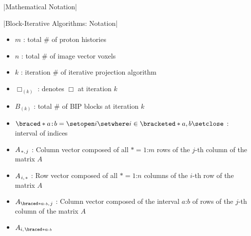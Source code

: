 \begin{tcbenvironment}|Mathematical Notation|
\begin{tcbparbox}|Block-Iterative Algorithms: Notation|%
    \begin{itemize}
        \item $m$ : total \# of proton histories
        \item $n$ : total \# of image vector voxels
        \item $k$ : iteration \# of iterative projection algorithm
        \item $\Box_{(k)}$ : denotes $\Box$ at iteration $k$
        \item $B_{(k)}$ : total \# of BIP blocks at iteration $k$
        \item $\braced*{a\texttt{:}b}=\setopen i\setwhere i\in\bracketed*{a,b}\setclose$ : interval of indices
        \item $A_{\kern1pt*,\kern1pt j}$ : Column vector composed of all $*=1\texttt{:}m$ rows of the $j$-th column of the matrix $A$
        \item $A_{\kern1pti,\kern1pt *}$ : Row vector composed of all $*=1\texttt{:}n$ columns of the $i$-th row of the matrix $A$
        \item $A_{\braced*{a\scriptscriptstyle\texttt{:}b},\kern1pt j}$ %
            : Column vector composed of the interval $a\texttt{:}b$ of rows of the $j$-th column of the matrix $A$
        \item $A_{i,\kern1pt \braced*{a\scriptscriptstyle\texttt{:}b}}$ %

\end{itemize}
\end{tcbparbox}
\end{tcbenvironment}
